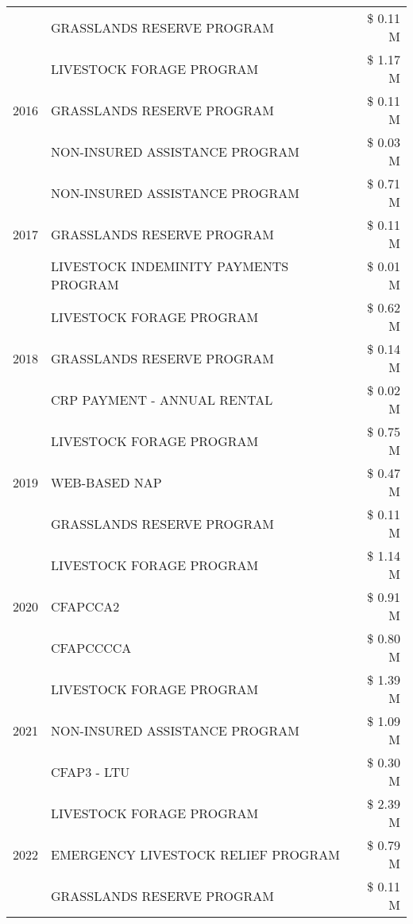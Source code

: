 \begin{tabular}{llr}
 & GRASSLANDS RESERVE PROGRAM & \$ 0.11 M \\
\cline{1-3}
\multirow[t]{3}{*}{2016} & LIVESTOCK FORAGE PROGRAM & \$ 1.17 M \\
 & GRASSLANDS RESERVE PROGRAM & \$ 0.11 M \\
 & NON-INSURED ASSISTANCE PROGRAM & \$ 0.03 M \\
\cline{1-3}
\multirow[t]{3}{*}{2017} & NON-INSURED ASSISTANCE PROGRAM & \$ 0.71 M \\
 & GRASSLANDS RESERVE PROGRAM & \$ 0.11 M \\
 & LIVESTOCK INDEMINITY PAYMENTS PROGRAM & \$ 0.01 M \\
\cline{1-3}
\multirow[t]{3}{*}{2018} & LIVESTOCK FORAGE PROGRAM & \$ 0.62 M \\
 & GRASSLANDS RESERVE PROGRAM & \$ 0.14 M \\
 & CRP PAYMENT - ANNUAL RENTAL & \$ 0.02 M \\
\cline{1-3}
\multirow[t]{3}{*}{2019} & LIVESTOCK FORAGE PROGRAM & \$ 0.75 M \\
 & WEB-BASED NAP & \$ 0.47 M \\
 & GRASSLANDS RESERVE PROGRAM & \$ 0.11 M \\
\cline{1-3}
\multirow[t]{3}{*}{2020} & LIVESTOCK FORAGE PROGRAM & \$ 1.14 M \\
 & CFAPCCA2 & \$ 0.91 M \\
 & CFAPCCCCA & \$ 0.80 M \\
\cline{1-3}
\multirow[t]{3}{*}{2021} & LIVESTOCK FORAGE PROGRAM & \$ 1.39 M \\
 & NON-INSURED ASSISTANCE PROGRAM & \$ 1.09 M \\
 & CFAP3 - LTU & \$ 0.30 M \\
\cline{1-3}
\multirow[t]{3}{*}{2022} & LIVESTOCK FORAGE PROGRAM & \$ 2.39 M \\
 & EMERGENCY LIVESTOCK RELIEF PROGRAM & \$ 0.79 M \\
 & GRASSLANDS RESERVE PROGRAM & \$ 0.11 M \\
\cline{1-3}
\bottomrule
\end{tabular}
